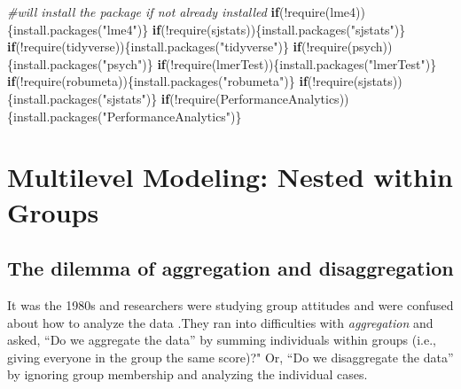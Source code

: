 \documentclass[
  english,
]{book}
\newenvironment{Shaded}{\begin{snugshade}}{\end{snugshade}}
\newcommand{\CommentTok}[1]{\textcolor[rgb]{0.56,0.35,0.01}{\textit{#1}}}
\newcommand{\ControlFlowTok}[1]{\textcolor[rgb]{0.13,0.29,0.53}{\textbf{#1}}}
\newcommand{\FunctionTok}[1]{\textcolor[rgb]{0.00,0.00,0.00}{#1}}
\newcommand{\NormalTok}[1]{#1}
\newcommand{\SpecialCharTok}[1]{\textcolor[rgb]{0.00,0.00,0.00}{#1}}
\newcommand{\StringTok}[1]{\textcolor[rgb]{0.31,0.60,0.02}{#1}}
\begin{document}
\begin{Shaded}
\begin{Highlighting}[]
\CommentTok{\#will install the package if not already installed}
\ControlFlowTok{if}\NormalTok{(}\SpecialCharTok{!}\FunctionTok{require}\NormalTok{(lme4))\{}\FunctionTok{install.packages}\NormalTok{(}\StringTok{"lme4"}\NormalTok{)\}}
\ControlFlowTok{if}\NormalTok{(}\SpecialCharTok{!}\FunctionTok{require}\NormalTok{(sjstats))\{}\FunctionTok{install.packages}\NormalTok{(}\StringTok{"sjstats"}\NormalTok{)\}}
\ControlFlowTok{if}\NormalTok{(}\SpecialCharTok{!}\FunctionTok{require}\NormalTok{(tidyverse))\{}\FunctionTok{install.packages}\NormalTok{(}\StringTok{"tidyverse"}\NormalTok{)\}}
\ControlFlowTok{if}\NormalTok{(}\SpecialCharTok{!}\FunctionTok{require}\NormalTok{(psych))\{}\FunctionTok{install.packages}\NormalTok{(}\StringTok{"psych"}\NormalTok{)\}}
\ControlFlowTok{if}\NormalTok{(}\SpecialCharTok{!}\FunctionTok{require}\NormalTok{(lmerTest))\{}\FunctionTok{install.packages}\NormalTok{(}\StringTok{"lmerTest"}\NormalTok{)\}}
\ControlFlowTok{if}\NormalTok{(}\SpecialCharTok{!}\FunctionTok{require}\NormalTok{(robumeta))\{}\FunctionTok{install.packages}\NormalTok{(}\StringTok{"robumeta"}\NormalTok{)\}}
\ControlFlowTok{if}\NormalTok{(}\SpecialCharTok{!}\FunctionTok{require}\NormalTok{(sjstats))\{}\FunctionTok{install.packages}\NormalTok{(}\StringTok{"sjstats"}\NormalTok{)\}}
\ControlFlowTok{if}\NormalTok{(}\SpecialCharTok{!}\FunctionTok{require}\NormalTok{(PerformanceAnalytics))\{}\FunctionTok{install.packages}\NormalTok{(}\StringTok{"PerformanceAnalytics"}\NormalTok{)\}}
\end{Highlighting}
\end{Shaded}

\hypertarget{multilevel-modeling-nested-within-groups}{%
\section{Multilevel Modeling: Nested within Groups}\label{multilevel-modeling-nested-within-groups}}

\hypertarget{the-dilemma-of-aggregation-and-disaggregation}{%
\subsection{The dilemma of aggregation and disaggregation}\label{the-dilemma-of-aggregation-and-disaggregation}}

It was the 1980s and researchers were studying group attitudes and were confused about how to analyze the data \citep{singer_applied_2003}.They ran into difficulties with \emph{aggregation} and asked, ``Do we aggregate the data'' by summing individuals within groups (i.e., giving everyone in the group the same score)?" Or, ``Do we disaggregate the data'' by ignoring group membership and analyzing the individual cases.
\end{document}
